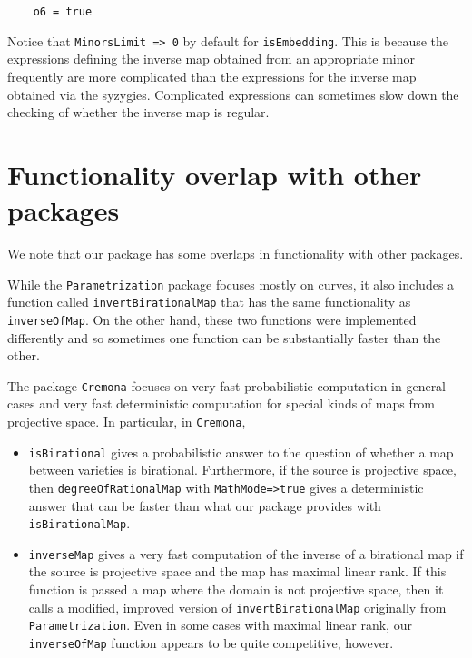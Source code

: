 \documentclass[11pt]{amsart}%
\numberwithin{equation}{theorem}
\renewcommand{\:}{\colon}
\theoremstyle{theorem}
\begin{document}
{{\begin{verbatim}
    o6 = true    
\end{verbatim}
}
{\color{black}\normalsize%
\noindent
Notice that {\tt MinorsLimit => 0} by default for {\tt isEmbedding}.  This is because the expressions defining the inverse map obtained from
an appropriate minor frequently are more complicated than the expressions for the inverse map obtained via the syzygies.  Complicated expressions can sometimes slow down the checking of whether the inverse map is regular.

\section{Functionality overlap with other packages}

We note that our package has some overlaps in functionality with other packages.

While the {\tt Parametrization} package \cite{ParametrizationPackage} focuses mostly on curves, it also includes a function called {\tt invertBirationalMap} that has the same functionality as {\tt inverseOfMap}. On the other hand, these two functions were implemented differently and so sometimes one function can be substantially faster than the other.

The package {\tt Cremona} \cite{CremonaSource,CremonaArticle} focuses on very fast probabilistic computation in general cases and very fast deterministic computation for special kinds of maps from projective space. In particular, in {\tt Cremona},

\begin{itemize}
\item{}     {\tt isBirational} gives a probabilistic answer to the question of whether a map between varieties is birational. Furthermore, if the source is projective space, then {\tt degreeOfRationalMap} with {\tt MathMode=>true}  gives a deterministic answer that can be faster than what our package  provides with {\tt isBirationalMap}.
\item{}  {\tt inverseMap} gives a very fast computation of the inverse of a birational map if the source is projective space and the map has maximal linear rank. If this function is passed a map where the domain is not projective space, then it calls a modified, improved version of {\tt invertBirationalMap} originally from {\tt Parametrization}. Even in some cases with maximal linear rank, our {\tt inverseOfMap} function appears to be quite competitive, however.
\end{itemize}

}}
\end{document}
